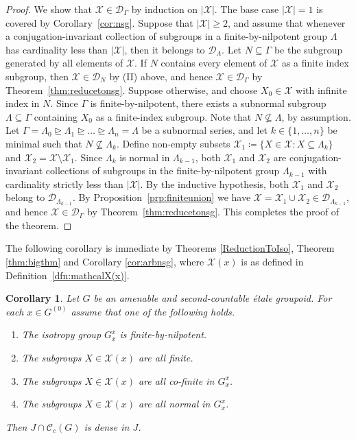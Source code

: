 \documentclass[11pt, oneside, reqno]{amsart}
\newcommand{\Gu}{G^{(0)}}
\newcommand{\cg}{\mathscr{C}_c(G)}
\newtheorem{cor}[thm]{Corollary}
\theoremstyle{definition}
\theoremstyle{remark}
\numberwithin{equation}{section}
\begin{document}
\begin{proof}
    We show that $\mathcal{X} \in \mathcal{D}_\Gamma$ by induction on $|\mathcal{X}|$. The base case $|\mathcal{X}| = 1$ is covered by Corollary~\ref{cor:nsg}. Suppose that $|\mathcal{X}| \ge 2$, and assume that whenever a conjugation-invariant collection of subgroups in a finite-by-nilpotent group $\Lambda$ has cardinality less than $|\mathcal{X}|$, then it belongs to $\mathcal{D}_\Lambda$. Let $N \subseteq \Gamma$ be the subgroup generated by all elements of $\mathcal{X}$. If $N$ contains every element of $\mathcal{X}$ as a finite index subgroup, then $\mathcal{X} \in \mathcal{D}_{N}$ by (II) above, and hence $\mathcal{X} \in \mathcal{D}_\Gamma$ by Theorem~\ref{thm:reducetonsg}. Suppose otherwise, and choose $X_0 \in \mathcal{X}$ with infinite index in $N$. Since $\Gamma$ is finite-by-nilpotent, there exists a subnormal subgroup $\Lambda \subseteq \Gamma$ containing $X_0$ as a finite-index subgroup. Note that $N \nsubseteq \Lambda$, by assumption. Let $\Gamma = \Lambda_0 \trianglerighteq \Lambda_1 \trianglerighteq \dots \trianglerighteq \Lambda_n = \Lambda$ be a subnormal series, and let $k \in \{1, \dots, n\}$ be minimal such that $N \nsubseteq \Lambda_k$. Define non-empty subsets $\mathcal{X}_1 \coloneq \{X \in \mathcal{X} \colon X \subseteq \Lambda_k \}$ and $\mathcal{X}_2 = \mathcal{X} \setminus \mathcal{X}_1$. Since $\Lambda_{k}$ is normal in $\Lambda_{k-1}$, both $\mathcal{X}_1$ and $\mathcal{X}_2$ are conjugation-invariant collections of subgroups in the finite-by-nilpotent group $\Lambda_{k-1}$ with cardinality strictly less than $|\mathcal{X}|$. By the inductive hypothesis, both $\mathcal{X}_1$ and $\mathcal{X}_2$ belong to $\mathcal{D}_{\Lambda_{k-1}}$. By Proposition~\ref{prp:finiteunion} we have $\mathcal{X} = \mathcal{X}_1 \cup \mathcal{X}_2 \in \mathcal{D}_{\Lambda_{k-1}}$, and hence $\mathcal{X} \in \mathcal{D}_\Gamma$ by Theorem~\ref{thm:reducetonsg}. This completes the proof of the theorem.
\end{proof}

The following corollary is immediate by Theorems \ref{ReductionToIso}, Theorem \ref{thm:bigthm} and Corollary \ref{cor:arbnsg}, where $\mathcal{X}(x)$ is as defined in Definition~\ref{dfn:mathcalX(x)}.

\begin{cor}\label{cor:bigcor}
    Let $G$ be an amenable and second-countable \'etale groupoid. For each $x\in \Gu$ assume that one of the following holds.
    \begin{enumerate}[label=(\Roman*)]
        \item The isotropy group $G_{x}^{x}$ is finite-by-nilpotent.
        \item The subgroups $X\in \mathcal{X}(x)$ are all finite.
        \item The subgroups $X\in \mathcal{X}(x)$ are all co-finite in $G^{x}_{x}$.
        \item The subgroups $X \in \mathcal{X}(x)$ are all normal in $G^x_x$.
    \end{enumerate}
    Then $J \cap \cg$ is dense in $J$.
\end{cor}
\end{document}

